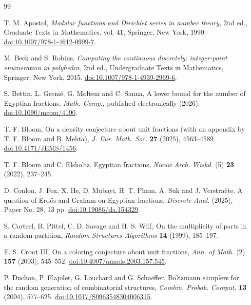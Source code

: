 \documentclass[11pt]{amsart}
\theoremstyle{remark}
\begin{document}
\begin{thebibliography}{99}
\raggedright

T. M. Apostol, \emph{Modular functions and Dirichlet series in number theory},
2nd ed., Graduate Texts in Mathematics, vol. 41, Springer, New York, 1990.
\href{https://doi.org/10.1007/978-1-4612-0999-7}{doi:10.1007/978-1-4612-0999-7}.

M. Beck and S. Robins, \emph{Computing the continuous discretely: integer-point enumeration in polyhedra},
2nd ed., Undergraduate Texts in Mathematics, Springer, New York, 2015.
\href{https://doi.org/10.1007/978-1-4939-2969-6}{doi:10.1007/978-1-4939-2969-6}.

S. Bettin, L. Greni\'e, G. Molteni and C. Sanna,
A lower bound for the number of Egyptian fractions,
\emph{Math. Comp.}, published electronically (2026).
\href{https://doi.org/10.1090/mcom/4190}{doi:10.1090/mcom/4190}.

T. F. Bloom, On a density conjecture about unit fractions (with an appendix by T. F. Bloom and B. Mehta),
\emph{J. Eur. Math. Soc.} \textbf{27} (2025), 4563--4589.
\href{https://doi.org/10.4171/JEMS/1456}{doi:10.4171/JEMS/1456}.

T. F. Bloom and C. Elsholtz, Egyptian fractions,
\emph{Nieuw Arch. Wiskd.} (5) \textbf{23} (2022), 237--245.

D. Conlon, J. Fox, X. He, D. Mubayi, H. T. Pham, A. Suk and J. Verstra\"ete,
A question of Erd\H{o}s and Graham on Egyptian fractions,
\emph{Discrete Anal.} (2025), Paper No. 28, 13 pp.
\href{https://doi.org/10.19086/da.154329}{doi:10.19086/da.154329}.

S. Corteel, B. Pittel, C. D. Savage and H. S. Wilf,
On the multiplicity of parts in a random partition,
\emph{Random Structures Algorithms} \textbf{14} (1999), 185--197.

E. S. Croot III, On a coloring conjecture about unit fractions,
\emph{Ann. of Math.} (2) \textbf{157} (2003), 545--552.
\href{https://doi.org/10.4007/annals.2003.157.545}{doi:10.4007/annals.2003.157.545}.

P. Duchon, P. Flajolet, G. Louchard and G. Schaeffer,
Boltzmann samplers for the random generation of combinatorial structures,
\emph{Combin. Probab. Comput.} \textbf{13} (2004), 577--625.
\href{https://doi.org/10.1017/S0963548304006315}{doi:10.1017/S0963548304006315}.


\end{thebibliography}
\end{document}
